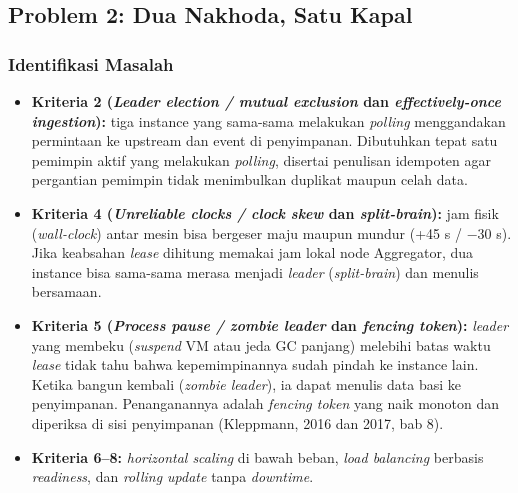 \subsection{Problem 2: Dua Nakhoda, Satu Kapal}

\subsubsection{Identifikasi Masalah}
\begin{itemize}
\item \textbf{Kriteria 2 (\textit{Leader election / mutual exclusion} dan \textit{effectively-once ingestion}):} tiga instance yang sama-sama melakukan \textit{polling} menggandakan permintaan ke upstream dan event di penyimpanan. Dibutuhkan tepat satu pemimpin aktif yang melakukan \textit{polling}, disertai penulisan idempoten agar pergantian pemimpin tidak menimbulkan duplikat maupun celah data.
\item \textbf{Kriteria 4 (\textit{Unreliable clocks / clock skew} dan \textit{split-brain}):} jam fisik (\textit{wall-clock}) antar mesin bisa bergeser maju maupun mundur (+45 s / $-$30 s). Jika keabsahan \textit{lease} dihitung memakai jam lokal node Aggregator, dua instance bisa sama-sama merasa menjadi \textit{leader} (\textit{split-brain}) dan menulis bersamaan.
\item \textbf{Kriteria 5 (\textit{Process pause / zombie leader} dan \textit{fencing token}):} \textit{leader} yang membeku (\textit{suspend} VM atau jeda GC panjang) melebihi batas waktu \textit{lease} tidak tahu bahwa kepemimpinannya sudah pindah ke instance lain. Ketika bangun kembali (\textit{zombie leader}), ia dapat menulis data basi ke penyimpanan. Penanganannya adalah \textit{fencing token} yang naik monoton dan diperiksa di sisi penyimpanan (Kleppmann, 2016 dan 2017, bab 8).
\item \textbf{Kriteria 6--8:} \textit{horizontal scaling} di bawah beban, \textit{load balancing} berbasis \textit{readiness}, dan \textit{rolling update} tanpa \textit{downtime}.
\end{itemize}

